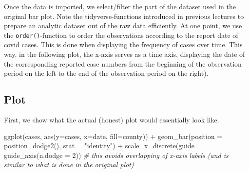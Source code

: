 \documentclass[
  12pt,
]{style/krantz}
\newenvironment{Shaded}{\begin{snugshade}}{\end{snugshade}}
\newcommand{\AttributeTok}[1]{\textcolor[rgb]{0.77,0.63,0.00}{#1}}
\newcommand{\CommentTok}[1]{\textcolor[rgb]{0.56,0.35,0.01}{\textit{#1}}}
\newcommand{\DecValTok}[1]{\textcolor[rgb]{0.00,0.00,0.81}{#1}}
\newcommand{\FunctionTok}[1]{\textcolor[rgb]{0.00,0.00,0.00}{#1}}
\newcommand{\NormalTok}[1]{#1}
\newcommand{\OtherTok}[1]{\textcolor[rgb]{0.56,0.35,0.01}{#1}}
\newcommand{\SpecialCharTok}[1]{\textcolor[rgb]{0.00,0.00,0.00}{#1}}
\newcommand{\StringTok}[1]{\textcolor[rgb]{0.31,0.60,0.02}{#1}}
\begin{document}
Once the data is imported, we select/filter the part of the dataset used in the original bar plot. Note the tidyverse-functions introduced in previous lectures to prepare an analytic dataset out of the raw data efficiently. At one point, we use the \texttt{order()}-function to order the observations according to the report date of covid cases. This is done when displaying the frequency of cases over time. This way, in the following plot, the x-axis serves as a time axis, displaying the date of the corresponding reported case numbers from the beginning of the observation period on the left to the end of the observation period on the right).

\begin{Shaded}
\end{Shaded}

\hypertarget{plot}{%
\subsection{Plot}\label{plot}}

First, we show what the actual (honest) plot would essentially look like.

\begin{Shaded}
\begin{Highlighting}[]
\FunctionTok{ggplot}\NormalTok{(cases, }\FunctionTok{aes}\NormalTok{(}\AttributeTok{y=}\NormalTok{cases, }\AttributeTok{x=}\NormalTok{date, }\AttributeTok{fill=}\NormalTok{county)) }\SpecialCharTok{+}
  \FunctionTok{geom\_bar}\NormalTok{(}\AttributeTok{position =} \FunctionTok{position\_dodge2}\NormalTok{(), }\AttributeTok{stat =} \StringTok{"identity"}\NormalTok{) }\SpecialCharTok{+}
  \FunctionTok{scale\_x\_discrete}\NormalTok{(}\AttributeTok{guide =} \FunctionTok{guide\_axis}\NormalTok{(}\AttributeTok{n.dodge =} \DecValTok{2}\NormalTok{)) }\CommentTok{\# this avoids overlapping of x{-}axis labels (and is similar to what is done in the original plot)}
\end{Highlighting}
\end{Shaded}
\end{document}
